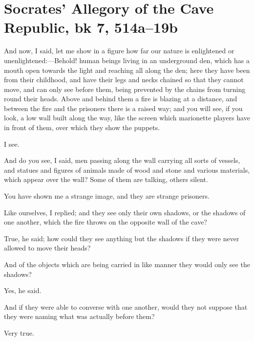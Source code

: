 
\author{Plato}
\chapter[Plato -- Socrates' Allegory of the Cave]{Socrates' Allegory
of the Cave\\\Large Republic, bk 7, 514a--19b}



And now, I said, let me show in a figure how far our nature is
enlightened or un\-en\-light\-ened:---Behold! human beings living in
an underground den, which has a mouth open towards the light and
reaching all along the den; here they have been from their childhood,
and have their legs and necks chained so that they cannot move, and
can only see before them, being prevented by the chains from turning
round their heads. Above and behind them a fire is blazing at a
distance, and between the fire and the prisoners there is a raised
way; and you will see, if you look, a low wall built along the way,
like the screen which marionette players have in front of them, over
which they show the puppets.

I see.

And do you see, I said, men passing along the wall carrying all sorts
of vessels, and statues and figures of animals made of wood and stone
and various materials, which appear over the wall? Some of them are
talking, others silent.

You have shown me a strange image, and they are strange prisoners.

Like ourselves, I replied; and they see only their own shadows, or the
shadows of one another, which the fire throws on the opposite wall of
the cave?

True, he said; how could they see anything but the shadows if they
were never allowed to move their heads?

And of the objects which are being carried in like manner they would
only see the shadows?

Yes, he said.

And if they were able to converse with one another, would they not
suppose that they were naming what was actually before them?

Very true.

